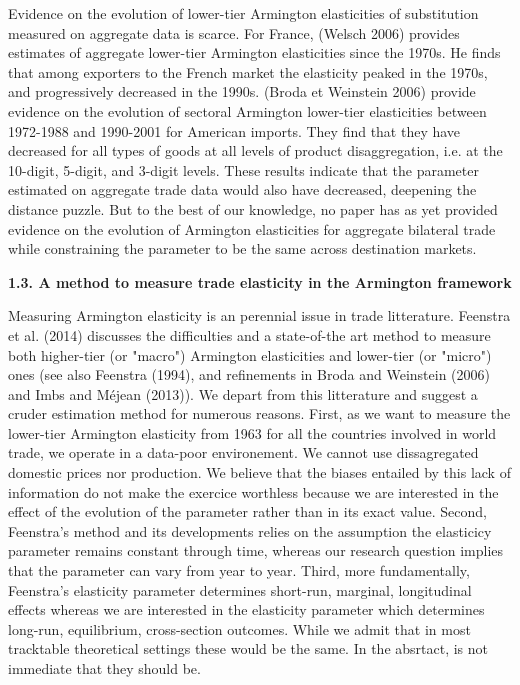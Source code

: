 \documentclass[12pt,twoside,a4paper,notitlepage]{article}
\begin{document}
Evidence on the evolution of lower-tier Armington elasticities of substitution measured on aggregate data is scarce. For France, (Welsch 2006) provides estimates of aggregate lower-tier Armington elasticities since the 1970s. He finds that among exporters to the French market the elasticity peaked in the 1970s, and progressively decreased in the 1990s. (Broda et Weinstein 2006) provide evidence on the evolution of sectoral Armington lower-tier elasticities between 1972-1988 and 1990-2001 for American imports. They find that they have decreased for all types of goods at all levels of product disaggregation, i.e. at the 10-digit, 5-digit, and 3-digit levels. These results indicate that the parameter estimated on aggregate trade data would also have decreased, deepening the distance puzzle. But to the best of our knowledge, no paper has as yet provided evidence on the evolution of Armington elasticities for aggregate bilateral trade while constraining the parameter to be the same across destination markets.

\textbf{1.3. \label{ref-001}A method to measure trade elasticity in the Armington framework\label{mark-1.3.}}

Measuring Armington elasticity is an perennial issue in trade litterature. Feenstra et al. (2014) discusses the difficulties and a state-of-the art method to measure both higher-tier (or "macro") Armington elasticities and lower-tier (or "micro") ones (see also Feenstra (1994), and refinements in Broda and Weinstein (2006) and Imbs and M\'{e}jean (2013)). We depart from this litterature and suggest a cruder estimation method for numerous reasons. First, as we want to measure the lower-tier Armington elasticity from 1963 for all the countries involved in world trade, we operate in a data-poor environement. We cannot use dissagregated domestic prices nor production. We believe that the biases entailed by this lack of information do not make the exercice worthless because we are interested in the effect of the evolution of the parameter rather than in its exact value. Second, Feenstra's method and its developments relies on the assumption the elasticicy parameter remains constant through time, whereas our research question implies that the parameter can vary from year to year. Third, more fundamentally, Feenstra's elasticity parameter determines short-run, marginal, longitudinal effects whereas we are interested in the elasticity parameter which determines long-run, equilibrium, cross-section outcomes. While we admit that in most tracktable theoretical settings these would be the same. In the absrtact, is not immediate that they should be.
\end{document}
